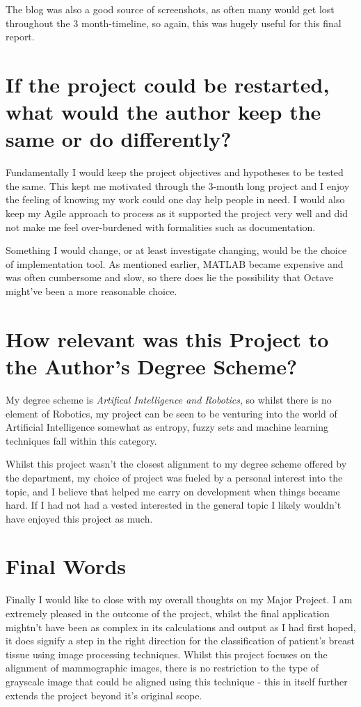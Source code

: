 The blog was also a good source of screenshots, as often many would get lost throughout the 3 month-timeline, so again, this was hugely useful for this final report.

\section{If the project could be restarted, what would the author keep the same or do differently?}

Fundamentally I would keep the project objectives and hypotheses to be tested the same. This kept me motivated through the 3-month long project and I enjoy the feeling of knowing my work could one day help people in need. I would also keep my Agile approach to process as it supported the project very well and did not make me feel over-burdened with formalities such as documentation.

Something I would change, or at least investigate changing, would be the choice of implementation tool. As mentioned earlier, MATLAB became expensive and was often cumbersome and slow, so there does lie the possibility that Octave might've been a more reasonable choice.

\section{How relevant was this Project to the Author's Degree Scheme?}

My degree scheme is \textit{Artifical Intelligence and Robotics}, so whilst there is no element of Robotics, my project can be seen to be venturing into the world of Artificial Intelligence somewhat as entropy, fuzzy sets and machine learning techniques fall within this category.

Whilst this project wasn't the closest alignment to my degree scheme offered by the department, my choice of project was fueled by a personal interest into the topic, and I believe that helped me carry on development when things became hard. If I had not had a vested interested in the general topic I likely wouldn't have enjoyed this project as much.

\section{Final Words}

Finally I would like to close with my overall thoughts on my Major Project. I am extremely pleased in the outcome of the project, whilst the final application mightn't have been as complex in its calculations and output as I had first hoped, it does signify a step in the right direction for the classification of patient's breast tissue using image processing techniques. Whilst this project focuses on the alignment of mammographic images, there is no restriction to the type of grayscale image that could be aligned using this technique - this in itself further extends the project beyond it's original scope.

